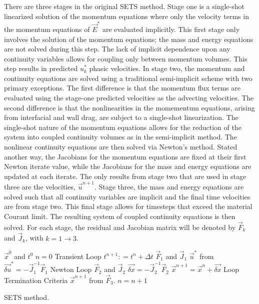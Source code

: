 There are three stages in the original SETS method.
Stage one is a single-shot linearized solution of the momentum equations where only the velocity terms in the momentum equations of $\vec{E}^{*}$ are evaluated implicitly.
This first stage only involves the solution of the momentum equations; the mass and energy equations are not solved during this step.
The lack of implicit dependence upon any continuity variables allows for coupling only between momentum volumes.
This step results in predicted $u^{*}_{k}$ phasic velocities.
In stage two, the momentum and continuity equations are solved using a traditional semi-implicit scheme with two primary exceptions.
The first difference is that the momentum flux terms are evaluated using the stage-one predicted velocities as the advecting velocities.
The second difference is that the nonlinearities in the momementum equations, arising from interfacial and wall drag, are subject to a single-shot linearization.
The single-shot nature of the momentum equations allows for the reduction of the system into coupled continuity volumes as in the semi-implicit method.
The nonlinear continuity equations are then solved via Newton's method.
Stated another way, the Jacobians for the momentum equations are fixed at their first Newton iterate value, while the Jacobians for the mass and energy equations are updated at each iterate.
The only results from stage two that are used in stage three are the velocities, $\vec{u}^{n+1}$.
Stage three, the mass and energy equations are solved such that all continuity variables are implicit and the final time velocities are from stage two.
This final stage allows for timesteps that exceed the material Courant limit.
The resulting system of coupled continuity equations is then solved.
For each stage, the residual and Jacobian matrix will be denoted by $\vec{F}_k$ and $\vec{J}_k$, with $k = 1 \to 3$.

\begin{algo}[H]
\setlength{\baselineskip}{0.625\baselineskip}
\begin{algorithmic}[1]
\Require $\vec{x}^{0}$ and $t^{0}$
\Set $n = 0$
\Loop \; Transient Loop
    \State $t^{n+1} : = t^{n} + \Delta t$
	\Calculate $\vec{F}_1$ and $\vec{J}_1$
	\Calculate $\vec{u}^{*}$ from $\vec{\delta u}^{*} = -\vec{J}^{-1}_1\vec{F}_1$
	\Loop \; Newton Loop
		\Calculate $\vec{F}_2$ and $\vec{J}_2$
		\BlackBox $\vec{\delta x} = - \vec{J}_2^{-1}\vec{F}_2$
		\Calculate $\vec{x}^{n+1} = \vec{x}^{n} + \vec{\delta x}$
		\BlackBox Loop Termination Criteria
	\EndLoop
	\Calculate $\vec{x}^{n+1}$ from $\vec{F}_3$.
	\State $n = n + 1$
\EndLoop
\end{algorithmic}
\caption{SETS method.}
\label{alg:sets}
\end{algo}

